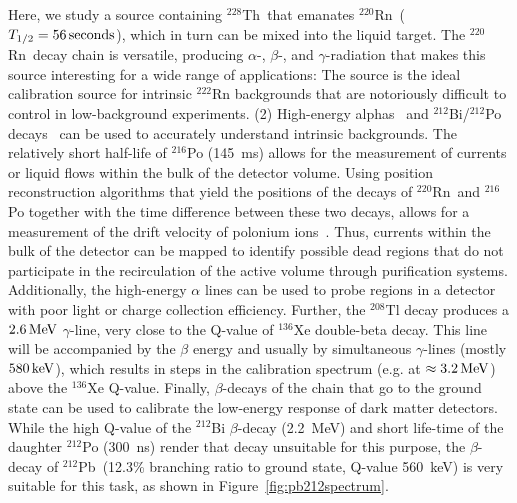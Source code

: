 Here, we study a source containing $^{228}$Th~that emanates $^{220}$Rn~($T_{1/2}=56\,\mathrm{seconds}$), which in turn can be mixed into the liquid target. The $^{220}$Rn~decay chain is versatile, producing $\alpha$-, $\beta$-, and $\gamma$-radiation that makes this source interesting for a wide range of applications: The source is the ideal calibration source for intrinsic $^{222}$Rn backgrounds that are notoriously difficult to control in low-background experiments. (2) High-energy alphas~\cite{Albert:2015vma,Aprile:2017fhu} and $^{212}$Bi/$^{212}$Po decays~\cite{Bellini:2012qg} can be used to accurately understand intrinsic backgrounds. The relatively short half-life of $^{216}$Po (145~ms) allows for the measurement of currents or liquid flows within the bulk of the detector volume. Using position reconstruction algorithms that yield the positions of the decays of $^{220}$Rn~and $^{216}$Po together with the time difference between these two decays, allows for a measurement of the drift velocity of polonium ions~\cite{Albert:2015vma}. Thus, currents within the bulk of the detector can be mapped to identify possible dead regions that do not participate in the recirculation of the active volume through purification systems. Additionally, the high-energy $\alpha$ lines can be used to probe regions in a detector with poor light or charge collection efficiency. Further, the $^{208}$Tl decay produces a $2.6\,\mathrm{MeV}$ $\gamma$-line, very close to the Q-value of $^{136}$Xe double-beta decay. This line will be accompanied by the $\beta$ energy and usually by simultaneous $\gamma$-lines (mostly $580\,\mathrm{keV}$), which results in steps in the calibration spectrum (e.g. at $\approx 3.2\,\mathrm{MeV}$) above the $^{136}$Xe Q-value. Finally, $\beta$-decays of the chain that go to the ground state can be used to calibrate the low-energy response of dark matter detectors. While the high Q-value of the $^{212}$Bi $\beta$-decay (2.2~MeV) and short life-time of the daughter $^{212}$Po (300~ns) render that decay unsuitable for this purpose, the $\beta$-decay of $^{212}$Pb~(12.3\% branching ratio to ground state, Q-value 560~keV) is very suitable for this task, as shown in Figure~\ref{fig:pb212spectrum}.

